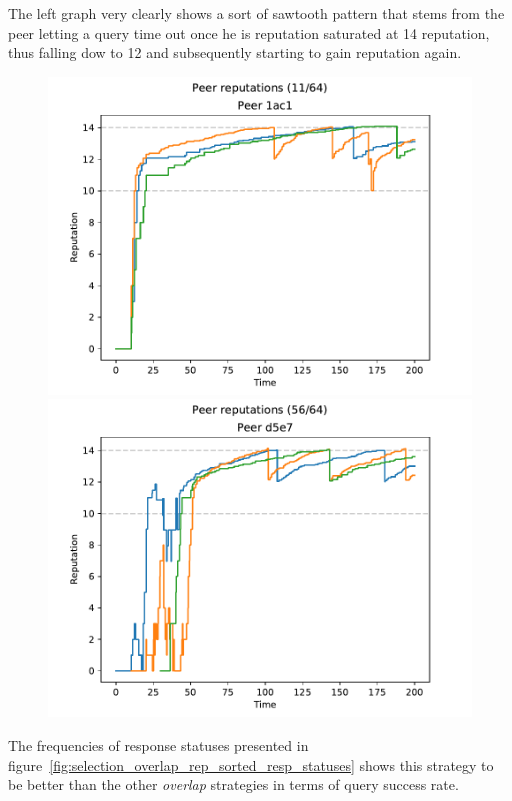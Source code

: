 The left graph very clearly shows a sort of sawtooth pattern that stems from the
peer letting a query time out once he is reputation saturated at 14 reputation,
thus falling dow to 12 and subsequently starting to gain reputation again.

\begin{figure}[t]
\centering
\includegraphics[width=0.5\columnwidth]{figures/selection_overlap_rep_sorted_peer_reps_11_of_64}%
\includegraphics[width=0.5\columnwidth]{figures/selection_overlap_rep_sorted_peer_reps_56_of_64}
\label{fig:selection_overlap_rep_sorted_peer_reps}
\end{figure}

The frequencies of response statuses presented in
figure~\ref{fig:selection_overlap_rep_sorted_resp_statuses} shows this
strategy to be better than the other \emph{overlap} strategies in terms of query
success rate.


